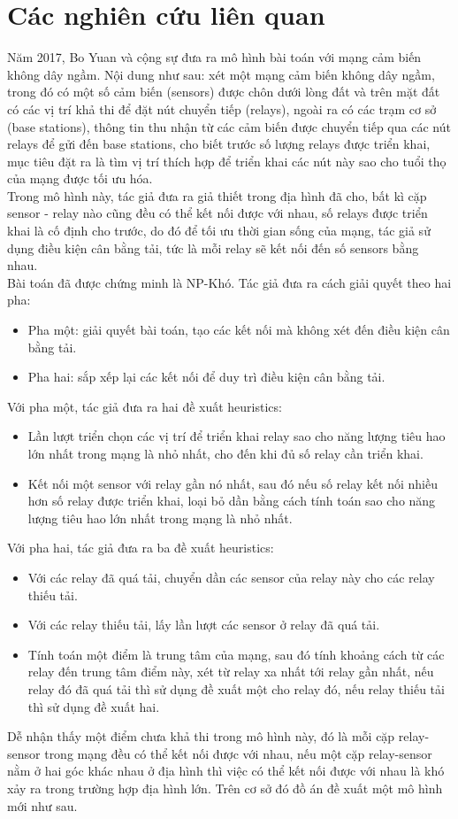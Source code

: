 \section{Các nghiên cứu liên quan }
Năm 2017, Bo Yuan và cộng sự \cite{xin_yao_paper} đưa ra mô hình bài toán với mạng cảm biến không dây ngầm. Nội dung như sau: xét một mạng cảm biến không dây ngầm, trong đó có một số cảm biến (sensors) được chôn dưới lòng đất và trên mặt đất có các vị trí khả thi để đặt nút chuyển tiếp (relays), ngoài ra có các trạm cơ sở (base stations), thông tin thu nhận từ các cảm biến được chuyển tiếp qua các nút relays để gửi đến base stations, cho biết trước số lượng relays được triển khai, mục tiêu đặt ra là tìm vị trí thích hợp để triển khai các nút này sao cho tuổi thọ của mạng được tối ưu hóa.
\\Trong mô hình này, tác giả đưa ra giả thiết trong địa hình đã cho, bất kì cặp sensor - relay nào cũng đều có thể kết nối được với nhau, số relays được triển khai là cố định cho trước, do đó để tối ưu thời gian sống của mạng, tác giả sử dụng điều kiện cân bằng tải, tức là mỗi relay sẽ kết nối đến số sensors bằng nhau.
\\Bài toán đã được chứng minh là NP-Khó. Tác giả đưa ra cách giải quyết theo hai pha:
\begin{itemize}
    \item Pha một: giải quyết bài toán, tạo các kết nối mà không xét đến điều kiện cân bằng tải.
    \item Pha hai: sắp xếp lại các kết nối để duy trì điều kiện cân bằng tải.
\end{itemize}
Với pha một, tác giả đưa ra hai đề xuất heuristics:
\begin{itemize}
    \item Lần lượt triển chọn các vị trí để triển khai relay sao cho năng lượng tiêu hao lớn nhất trong mạng là nhỏ nhất, cho đến khi đủ số relay cần triển khai.
    \item Kết nối một sensor với relay gần nó nhất, sau đó nếu số relay kết nối nhiều hơn số relay được triển khai, loại bỏ dần bằng cách tính toán sao cho năng lượng tiêu hao lớn nhất trong mạng là nhỏ nhất.
\end{itemize}
Với pha hai, tác giả đưa ra ba đề xuất heuristics:
\begin{itemize}
    \item Với các relay đã quá tải, chuyển dần các sensor của relay này cho các relay thiếu tải.
    \item Với các relay thiếu tải, lấy lần lượt các sensor ở relay đã quá tải.
    \item Tính toán một điểm là trung tâm của mạng, sau đó tính khoảng cách từ các relay đến trung tâm điểm này, xét từ relay xa nhất tới relay gần nhất, nếu relay đó đã quá tải thì sử dụng đề xuất một cho relay đó, nếu relay thiếu tải thì sử dụng đề xuất hai.
\end{itemize}
Dễ nhận thấy một điểm chưa khả thi trong mô hình này, đó là mỗi cặp relay-sensor trong mạng đều có thể kết nối được với nhau, nếu một cặp relay-sensor nằm ở hai góc khác nhau ở địa hình thì việc có thể kết nối được với nhau là khó xảy ra trong trường hợp địa hình lớn. Trên cơ sở đó đồ án đề xuất một mô hình mới như sau.
